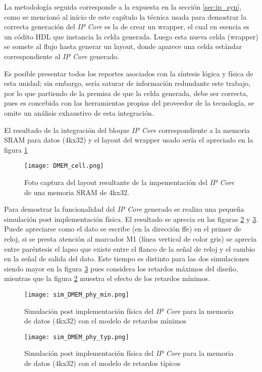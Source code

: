La metodología seguida corresponde a la expuesta en la sección \ref{sec:ip_syn}, como se mencionó al inicio de este capítulo la técnica usada para demostrar la correcta generación del \textit{IP Core} es la de crear un wrapper, el cual en esencia es un códito HDL que instancia la celda generada. Luego esta nueva celda (wrapper) se somete al flujo hasta generar un layout, donde aparece una celda estándar correspondiente al \textit{IP Core} generado.

Es posible presentar todos los reportes asociados con la síntesis lógica y física de esta unidad; sin embargo, sería saturar de información redundante este trabajo, por lo que partiendo de la premisa de que la celda generada, debe ser correcta, pues es concebida con las herramientas propias del proveedor de la tecnología, se omite un análisis exhaustivo de esta integración.

El resultado de la integración del bloque \textit{IP Core} correspondiente a la memoria SRAM para datos (4kx32) y el layout del wrapper usado sería el apreciado en la figura \ref{fig:dram_cell}

\begin{figure}[h]
\texttt{[image: DMEM\_cell.png]}
\centering
\caption{Foto captura del layout resultante de la impementación del \textit{IP Core} de una memoria SRAM de 4kx32.}
\label{fig:dram_cell}
\end{figure}

Para demostrar la funcionalidad del \textit{IP Core} generado se realiza una pequeña simulación post implementación física. El resultado se aprecia en las figuras \ref{fig:dram_sim_m} y \ref{fig:dram_sim_t}. Puede apreciarse como el dato se escribe (en la dirección ffe) en el primer de reloj, si se presta atención al marcador M1 (línea vertical de color gris) se aprecia entre paréntesis el lapso que existe entre el flanco de la señal de reloj y el cambio en la señal de salida del dato. Este tiempo es distinto para las dos simulaciones siendo mayor en la figura \ref{fig:dram_sim_t} pues considera los retardos máximos del diseño, mientras que la figura \ref{fig:dram_sim_m} muestra el efecto de los retardos mínimos.

\begin{figure}[h]
\texttt{[image: sim\_DMEM\_phy\_min.png]}
\centering
\caption{Simulación post implementación física del \textit{IP Core} para la memoria de datos (4kx32) con el modelo de retardos mínimos}
\label{fig:dram_sim_m}
\end{figure}

\begin{figure}[h]
\texttt{[image: sim\_DMEM\_phy\_typ.png]}
\centering
\caption{Simulación post implementación física del \textit{IP Core} para la memoria de datos (4kx32) con el modelo de retardos típicos}
\label{fig:dram_sim_t}
\end{figure}